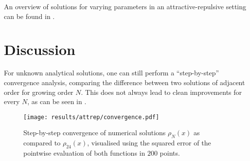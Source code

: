 An overview of solutions for varying parameters in an attractive-repulsive setting can be found in .




\pagebreak

\section{Discussion}
For unknown analytical solutions, one can still perform a ``step-by-step'' convergence analysis, comparing the difference between two solutions of adjacent order for growing order $N$.
This does not always lead to clean improvements for every $N$, as can be seen in .

\begin{figure}[H]
  \centering
  \texttt{[image: results/attrep/convergence.pdf]}
  \caption[Step-by-step convergence of solutions compared to order 24]{Step-by-step convergence of numerical solutions $\rho_N(x)$ as compared to $\rho_{24}(x)$, visualised using the squared error of the pointwise evaluation of both functions in $200$ points.}
  \label{fig:convergence}
\end{figure}
